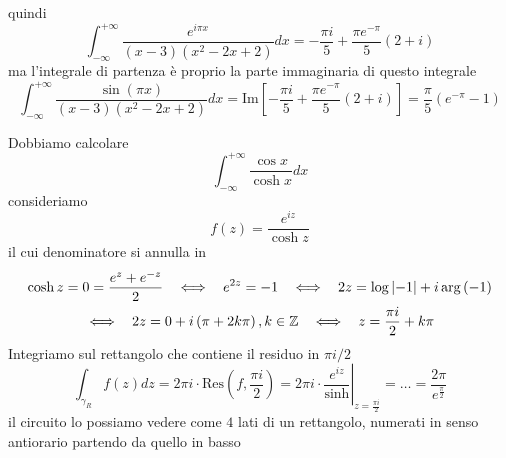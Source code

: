 quindi
\begin{equation*}
\int ^{+\infty }_{-\infty }\frac{e^{i\pi x}}{\left( x-3\right)\left( x^{2} -2x+2\right)} dx=-\frac{\pi i}{5} +\frac{\pi e^{-\pi }}{5}\left( 2+i\right)
\end{equation*}
ma l'integrale di partenza è proprio la parte immaginaria di questo integrale
\begin{equation*}
\int ^{+\infty }_{-\infty }\frac{\sin\left( \pi x\right)}{\left( x-3\right)\left( x^{2} -2x+2\right)} dx=\mathrm{Im}\left[ -\frac{\pi i}{5} +\frac{\pi e^{-\pi }}{5}\left( 2+i\right)\right] =\frac{\pi }{5}\left( e^{-\pi } -1\right)
\end{equation*}
\Soluzione

Dobbiamo calcolare
\begin{equation*}
\int ^{+\infty }_{-\infty }\frac{\cos x}{\cosh x} dx
\end{equation*}
consideriamo
\begin{equation*}
f\left( z\right) =\frac{e^{iz}}{\cosh z}
\end{equation*}
il cui denominatore si annulla in
\begin{gather*}
\cosh z=0=\frac{e^{z} +e^{-z}}{2} \ \ \iff \ \ e^{2z} =-1\ \ \iff \ \ 2z=\log\left| -1\right| +i\arg\left( -1\right)\\
\iff \ \ 2z=0+i\left( \pi +2k\pi \right) ,k\in \ZZ  \ \ \iff \ \ z=\frac{\pi i}{2} +k\pi 
\end{gather*}
Integriamo sul rettangolo che contiene il residuo in $\pi i/2$
\begin{equation*}
\int _{\gamma _{R}} f\left( z\right) dz=2\pi i\cdotp \mathrm{Res}\left( f,\frac{\pi i}{2}\right) =2\pi i\cdotp \left. \frac{e^{iz}}{\sinh}\right| _{z=\frac{\pi i}{2}} =\dotsc =\frac{2\pi }{e^{\frac{\pi }{2}}}
\end{equation*}
il circuito lo possiamo vedere come $4$ lati di un rettangolo, numerati in senso antiorario partendo da quello in basso


